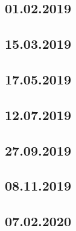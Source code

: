 \documentclass[a4paper,12p]{article}
\begin{document}
	\newpage
	\subsection{01.02.2019}
	
	
	
	
	
	\subsection{15.03.2019}
		
	
	
	
	
	\newpage	
	\subsection{17.05.2019}
	
	
	
	

	\newpage
	\subsection{12.07.2019}
	
	
	
	
	
	\newpage
	\subsection{27.09.2019}
	
	
	
	
	
	\subsection{08.11.2019}
	
	
	
	
	
	\newpage
	\subsection{07.02.2020}
	
	
	
	
\end{document}
